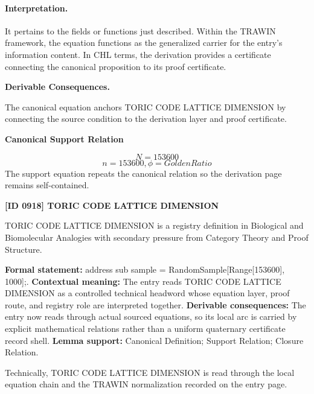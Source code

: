 \paragraph{Interpretation.}
It pertains to the fields or functions just described. Within the TRAWIN framework, the equation functions as the generalized carrier for the entry’s information content. In CHL terms, the derivation provides a certificate connecting the canonical proposition to its proof certificate.

\par\vspace{0.35em}
\noindent\textbf{Derivable Consequences.}\quad
\begingroup
\footnotesize
\raggedright
The canonical equation anchors TORIC CODE LATTICE DIMENSION by connecting the source condition to the derivation layer and proof certificate.
\par\endgroup

\noindent\textbf{Canonical Support Relation}\par
\[
N=153600
\]
\[
{n = 153600, \phi = GoldenRatio}
\]
\noindent The support equation repeats the canonical relation so the derivation page remains self-contained.\par

\clearpage
\noindent\textbf{[ID 0918] TORIC CODE LATTICE DIMENSION}\par
\vspace{0.35em}
\begingroup\small
{}
TORIC CODE LATTICE DIMENSION is a registry definition in Biological and Biomolecular Analogies with secondary pressure from Category Theory and Proof Structure.

\begingroup\footnotesize\setlength{\emergencystretch}{3em}\sloppy
\textbf{Formal statement:} address sub sample = RandomSample[Range[153600], 1000];. \textbf{Contextual meaning:} The entry reads TORIC CODE LATTICE DIMENSION as a controlled technical headword whose equation layer, proof route, and registry role are interpreted together. \textbf{Derivable consequences:} The entry now reads through actual sourced equations, so its local arc is carried by explicit mathematical relations rather than a uniform quaternary certificate record shell. \textbf{Lemma support:} Canonical Definition; Support Relation; Closure Relation.\par
\endgroup

Technically, TORIC CODE LATTICE DIMENSION is read through the local equation chain and the TRAWIN normalization recorded on the entry page.

